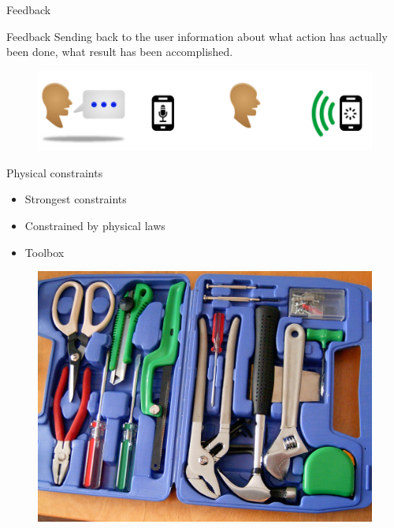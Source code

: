 \documentclass{beamer}
\begin{document}
\begin{frame}{Feedback}
	\begin{block}{Feedback}
	Sending back to the user information about what action has actually been done, what result has been accomplished.
	\end{block}
	\begin{figure}[ht]
	\includegraphics[scale=0.3]{retro-action-speaking.jpg}
	\end{figure}
\end{frame}

\begin{frame}{Physical constraints}
    		 \begin{itemize}
    		 \item Strongest constraints
    		 \item Constrained by physical laws
    		 \item Toolbox
    		 \end{itemize}
             \begin{figure}
             \includegraphics[scale=0.1]{toolbox.jpg}
             \end{figure}

\end{frame}
\end{document}
